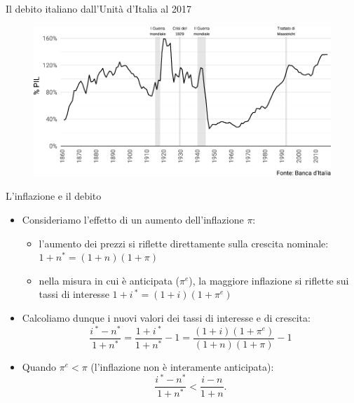 \documentclass[aspectratio=149,11pt,italian]{beamer}
\begin{document}
\begin{frame}{Il debito italiano dall'Unità d'Italia al 2017}

  \begin{figure}
    \centering
    \includegraphics[width=\textwidth]{./figure/debito-PIL-1861-2017.pdf}
  \end{figure}
\end{frame}


\begin{frame}{L'inflazione e il debito}
  
  \begin{itemize}
  \item Consideriamo l'effetto di un aumento dell'inflazione $\pi$:
    \begin{itemize}
    \item l'aumento dei prezzi si riflette direttamente sulla
      crescita nominale:  $1+n^*=(1+n)(1+\pi)$
    \item nella misura in cui è anticipata ($\pi^e$), la maggiore inflazione si riflette sui
      tassi di interesse $1+i\,^*=(1+i)(1+\pi^e)$
    \end{itemize}
  \item Calcoliamo dunque i nuovi valori dei tassi di interesse e di crescita:
    \begin{equation*}
      \frac{i\,^*-n^*}{1+n^*} = \frac{1+i\,^*}{1+n^*}-1 = \frac{(1+i)(1+\pi^e)}{(1+n)(1+\pi)}-1
    \end{equation*}
  \item Quando $\pi^e<\pi$ (l'inflazione non è interamente anticipata):
    \begin{equation*}
      \frac{i\,^*-n^*}{1+n^*} < \frac{i-n}{1+n}.
    \end{equation*}
  \end{itemize}
\end{frame}
\end{document}
